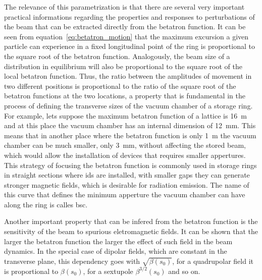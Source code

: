 	The relevance of this parametrization is that there are several very important practical informations regarding the properties and responses to perturbations of the beam that can be extracted directly from the betatron function. It can be seen from equation~\eqref{eq:betatron_motion} that the maximum excursion a given particle can experience in a fixed longitudinal point of the ring is proportional to the square root of the betatron function. Analogously, the beam size of a distribution in equilibrium will also be proportional to the square root of the local betatron function. Thus, the ratio between the amplitudes of movement in two different positions is proportional to the ratio of the square root of the betatron functions at the two locations, a property that is fundamental in the process of defining the transverse sizes of the vacuum chamber of a storage ring. For example, lets suppose the maximum betatron function of a lattice is \SI{16}{\meter} and at this place the vacuum chamber has an internal dimension of \SI{12}{\milli\meter}. This means that in another place where the betatron function is only \SI{1}{\meter} the vacuum chamber can be much smaller, only \SI{3}{\milli\meter}, without affecting the stored beam, which would allow the installation of devices that requires smaller appertures. This strategy of focusing the betatron function is commonly used in storage rings in straight sections where \gls{ids} are installed, with smaller gaps they can generate stronger magnetic fields, which is desirable for radiation emission. The name of this curve that defines the minimum apperture the vacuum chamber can have along the ring is calles \gls{bsc}.

	Another important property that can be infered from the betatron function is the sensitivity of the beam to spurious eletromagnetic fields. It can be shown that the larger the betatron function the larger the effect of such field in the beam dynamics. In the special case of dipolar fields, which are constant in the transverse plane, this dependency goes with $\sqrt{\beta(s_0)}$, for a quadrupolar field it is proportional to $\beta(s_0)$, for a sextupole $\beta^{3/2}(s_0)$ and so on.

